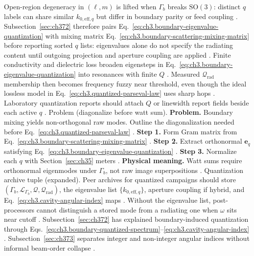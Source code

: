Open-region degeneracy in \((\ell,m)\) is lifted when \(\Gamma_{b}\) breaks \(\mathrm{SO}(3)\): distinct \(q\) labels can share
similar \(k_{0,\mathrm{eff},q}\) but differ in boundary parity or feed coupling \cite{stratton1941}.
Subsection~\ref{sec:ch372} therefore pairs Eq.~\eqref{eq:ch3.boundary-eigenvalue-quantization} with mixing matrix
Eq.~\eqref{eq:ch3.boundary-scattering-mixing-matrix} before reporting sorted \(q\) lists: eigenvalues alone do not specify the
radiating content until outgoing projection and aperture coupling are applied \cite{hansen1988}.
Finite conductivity and dielectric loss broaden eigensteps in Eq.~\eqref{eq:ch3.boundary-eigenvalue-quantization} into resonances with
finite \(Q\) \cite{jackson1999}. Measured \(\mathcal{Q}_{\mathrm{rad}}\) membership then becomes frequency
fuzzy near threshold, even though the ideal lossless model in Eq.~\eqref{eq:ch3.quantized-parseval-law} uses sharp hops
\cite{harrington2001}. Laboratory quantization reports should attach \(Q\) or linewidth report fields beside each active \(q\)
\cite{stratton1941}.
Problem (diagonalize before watt sum). \textbf{Problem.} Boundary mixing yields non-orthogonal raw modes. Outline the diagonalization needed before
Eq.~\eqref{eq:ch3.quantized-parseval-law} \cite{harrington2001}.
\textbf{Step 1.} Form Gram matrix from Eq.~\eqref{eq:ch3.boundary-scattering-mixing-matrix} \cite{hansen1988}.
\textbf{Step 2.} Extract orthonormal \(\mathbf{e}_{q}\) satisfying Eq.~\eqref{eq:ch3.boundary-eigenvalue-quantization} \cite{kato1995}.
\textbf{Step 3.} Normalize each \(q\) with Section~\ref{sec:ch35} meters \cite{poynting1884}.
\textbf{Physical meaning.} Watt sums require orthonormal eigenmodes under \(\Gamma_{b}\), not raw image superpositions \cite{stratton1941}.
Quantization archive tuple (expanded). Peer archives for quantized campaigns should store \((\Gamma_{b},\mathcal{L}_{\Gamma_{b}},\mathcal{Q},\mathcal{Q}_{\mathrm{rad}})\),
the eigenvalue list \(\{k_{0,\mathrm{eff},q}\}\), aperture coupling if hybrid, and Eq.~\eqref{eq:ch3.cavity-angular-index} maps
\cite{harrington2001}. Without the eigenvalue list, post-processors cannot distinguish a stored mode
from a radiating one when \(\omega\) sits near cutoff \cite{harrington2001}.
Subsection~\ref{sec:ch372} has explained boundary-induced quantization through
Eqs.~\eqref{eq:ch3.boundary-quantized-spectrum}--\eqref{eq:ch3.cavity-angular-index}
\cite{stratton1941}. Subsection~\ref{sec:ch373} separates integer and non-integer angular
indices without informal beam-order collapse \cite{hansen1988}.
